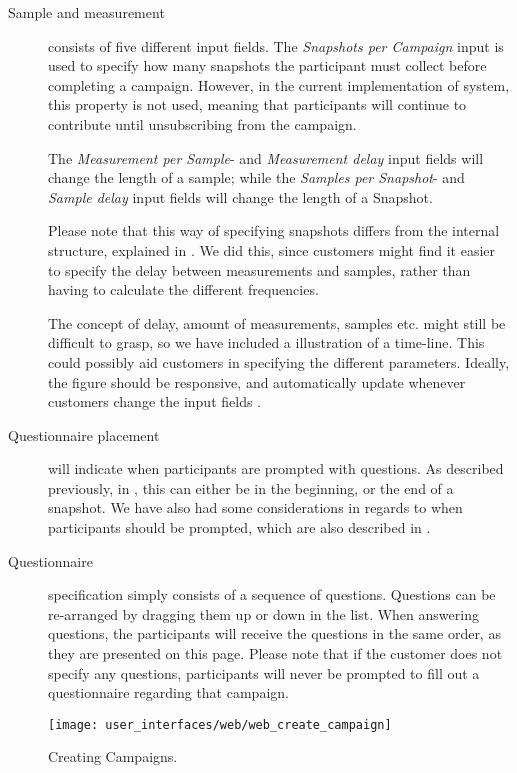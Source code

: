 \begin{description}
    \item[Sample and measurement] consists of five different input fields. The \emph{Snapshots per Campaign} input is used to specify how many snapshots the participant must collect before completing a campaign. However, in the current implementation of system, this property is not used, meaning that participants will continue to contribute until unsubscribing from the campaign. 

    The \emph{Measurement per Sample}- and \emph{Measurement delay} input fields will change the length of a sample; while the \emph{Samples per Snapshot}- and \emph{Sample delay} input fields will change the length of a Snapshot. 

    Please note that this way of specifying snapshots differs from the internal structure, explained in . We did this, since customers might find it easier to specify the delay between measurements and samples, rather than having to calculate the different frequencies. 

    The concept of delay, amount of measurements, samples etc. might still be difficult to grasp, so we have included a illustration of a time-line. This could possibly aid customers in specifying the different parameters. Ideally, the figure should be responsive, and automatically update whenever customers change the input fields . 

    \item[Questionnaire placement] will indicate when participants are prompted with questions. As described previously, in , this can either be in the beginning, or the end of a snapshot. We have also had some considerations in regards to when participants should be prompted, which are also described in .

    \item[Questionnaire] specification simply consists of a sequence of questions. Questions can be re-arranged by dragging them up or down in the list. When answering questions, the participants will receive the questions in the same order, as they are presented on this page. Please note that if the customer does not specify any questions, participants will never be prompted to fill out a questionnaire regarding that campaign. 
\end{description}

\begin{figure}[!htbp]
\centering
\texttt{[image: user\_interfaces/web/web\_create\_campaign]}
\caption{Creating Campaigns.}
\label{fig:web_create_campaign}
\end{figure}
\FloatBarrier

